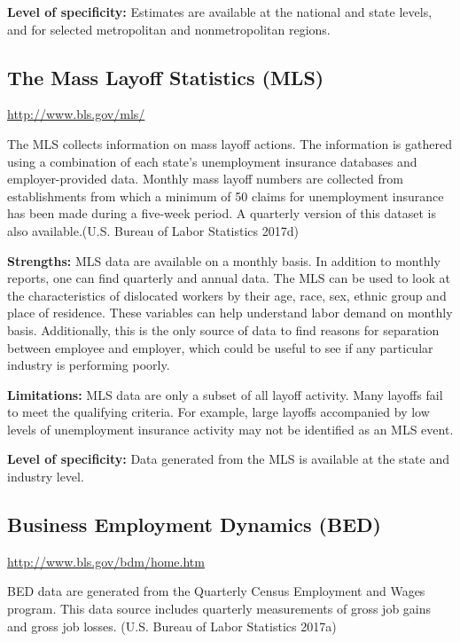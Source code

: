 \documentclass[]{book}
\theoremstyle{definition}
\theoremstyle{definition}
\theoremstyle{definition}
\theoremstyle{remark}
\begin{document}
\textbf{Level of specificity:} Estimates are available at the national
and state levels, and for selected metropolitan and nonmetropolitan
regions.

\subsection{The Mass Layoff Statistics
(MLS)}\label{the-mass-layoff-statistics-mls}

\url{http://www.bls.gov/mls/}

The MLS collects information on mass layoff actions. The information is
gathered using a combination of each state's unemployment insurance
databases and employer-provided data. Monthly mass layoff numbers are
collected from establishments from which a minimum of 50 claims for
unemployment insurance has been made during a five-week period. A
quarterly version of this dataset is also available.(U.S. Bureau of
Labor Statistics 2017d)

\textbf{Strengths:} MLS data are available on a monthly basis. In
addition to monthly reports, one can find quarterly and annual data. The
MLS can be used to look at the characteristics of dislocated workers by
their age, race, sex, ethnic group and place of residence. These
variables can help understand labor demand on monthly basis.
Additionally, this is the only source of data to find reasons for
separation between employee and employer, which could be useful to see
if any particular industry is performing poorly.

\textbf{Limitations:} MLS data are only a subset of all layoff activity.
Many layoffs fail to meet the qualifying criteria. For example, large
layoffs accompanied by low levels of unemployment insurance activity may
not be identified as an MLS event.

\textbf{Level of specificity:} Data generated from the MLS is available
at the state and industry level.

\subsection{Business Employment Dynamics
(BED)}\label{business-employment-dynamics-bed}

\url{http://www.bls.gov/bdm/home.htm}

BED data are generated from the Quarterly Census Employment and Wages
program. This data source includes quarterly measurements of gross job
gains and gross job losses. (U.S. Bureau of Labor Statistics 2017a)
\end{document}
